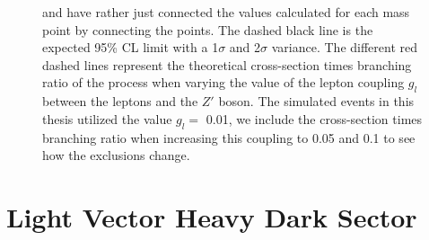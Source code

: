 \documentclass[12pt, a4paper]{book}
\begin{document}
\begin{figure}[!ht]
{   and have rather just connected the values calculated for each mass point by connecting the points. The dashed black line is the expected 95\% CL limit with a 1$\sigma$ and 2$\sigma$ variance. 
   The different red dashed lines represent the theoretical cross-section times branching ratio of the process when varying the value of the lepton coupling $g_l$ between the leptons and the $Z'$ boson. The simulated events in this thesis utilized the value $g_l=$ 0.01, we include the cross-section times branching ratio when increasing this coupling to 0.05 and 0.1 to see how the exclusions change.  }\label{fig:DH_LDS_me_SRS}
\end{figure}





\clearpage
\section{Light Vector Heavy Dark Sector}
\end{document}
